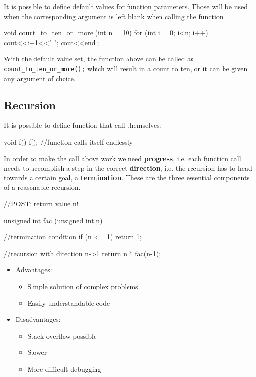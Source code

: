 \documentclass[10pt,a4paper]{scrartcl}
\begin{document}
\begin{multicols*}{2}
It is possible to define default values for function parameters. Those will be used when the corresponding argument is left blank when calling the function.

\begin{TPCpp}
void count_to_ten_or_more (int n = 10){
	for (int i = 0; i<n; i++){
		cout<<i+1<<" ";
	}
	cout<<endl;
}
\end{TPCpp}

With the default value set, the function above can be called as \verb+count_to_ten_or_more();+ which will result in a count to ten, or it can be given any argument of choice.
\fi

\subsection{Recursion}
\label{sec:Recursion}

It is possible to define function that call themselves:

\begin{TPCpp}
void f(){
	f(); //function calls itself endlessly
}
\end{TPCpp}

In order to make the call above work we need \textbf{progress}, i.e. each function call needs to accomplish a step in the correct \textbf{direction}, i.e. the recursion has to head towards a certain goal, a \textbf{termination}. These are the three essential components of a reasonable recursion.

\begin{TPCpp}
//POST: return value n!

unsigned int fac (unsigned int n)
{
	//termination condition
	if (n <= 1) return 1;
	
	//recursion with direction n->1
	return n * fac(n-1);
}
\end{TPCpp}

\begin{itemize}
\item Advantages:
\begin{itemize}
\item Simple solution of complex problems
\item Easily understandable code
\end{itemize}
\item Disadvantages:
\begin{itemize}
\item Stack overflow possible
\item Slower
\item More difficult debugging
\end{itemize}
\end{itemize}


\end{multicols*}
\end{document}
